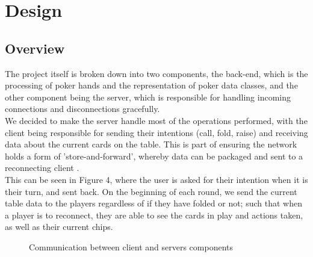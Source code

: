 \documentclass[11pt]{article}
\begin{document}

\newpage
\section{Design}

\subsection{Overview}

The project itself is broken down into two components, the back-end, which is the processing of poker hands and the representation of poker data classes, and the other component being the server, which is responsible for handling incoming connections and disconnections gracefully.  \\

We decided to make the server handle most of the operations performed, with the client being responsible for sending their intentions (call, fold, raise) and receiving data about the current cards on the table. This is part of ensuring the network holds a form of 'store-and-forward', whereby data can be packaged and sent to a reconnecting client \cite{ieee_storefwd}. \\

This can be seen in Figure 4, where the user is asked for their intention when it is their turn, and sent back. On the beginning of each round, we send the current table data to the players regardless of if they have folded or not; such that when a player is to reconnect, they are able to see the cards in play and actions taken, as well as their current chips.

\noindent
	\begin{figure}[h]
%
\caption{Communication between client and servers components}
	\end{figure} 
	
\end{document}
